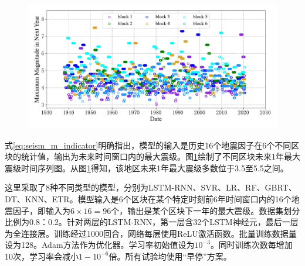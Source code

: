 \begin{figure}[!htbp]
  \centering
  \includegraphics[width=\textwidth]{Img/chap5_seism/seism_magnitude_index_1932_2021.pdf}
  \vspace{-1cm}
  \label{fig:seism_magnitude_index_1932_2021}
\end{figure}

式\ref{eq:seism_m_indicator}明确指出，模型的输入是历史16个地震因子在6个不同区块的统计值，输出为未来时间窗口内的最大震级。图\ref{fig:seism_magnitude_index_1932_2021}绘制了不同区块未来1年最大震级时间序列图。从图\ref{fig:seism_magnitude_index_1932_2021}得知，该地区未来1年最大震级多数位于3.5至5.5之间。

这里采取了8种不同类型的模型，分别为LSTM-RNN、SVR、LR、RF、GBRT、DT、KNN、ETR。模型输入是6个区块在某个特定时刻前6年时间窗口内的16个地震因子，即输入为$6\times 16=96$个，输出是某个区块下一年的最大震级。数据集划分比例为0.8：0.2。针对两层的LSTM-RNN，第一层含32个LSTM神经元，最后一层为全连接层。训练经过1000回合，网络每层使用ReLU激活函数。批量训练数据量设为128。Adam方法作为优化器。学习率初始值设为$10^{-3}$。同时训练次数每增加10次，学习率会减小$1-10^{-6}$倍。所有试验均使用“早停”方案。

